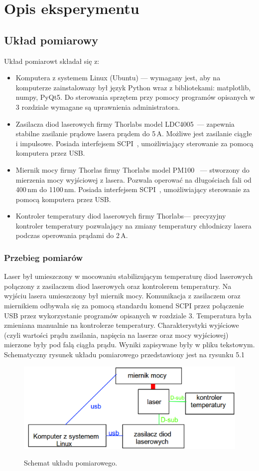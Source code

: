 \chapter{Opis eksperymentu}
\section{Układ pomiarowy}
Układ pomiarowt składał się z:
\begin{itemize}
\item Komputera z systemem Linux (Ubuntu) --- wymagany jest, aby na komputerze zainstalowany był język Python wraz z bibliotekami:
matplotlib, numpy, PyQt5. Do sterowania sprzętem przy pomocy programów opisanych w 3 rozdziale wymagane są uprawnienia administratora.
\item Zasilacza diod laserowych firmy Thorlabs model LDC4005~\cite{Ldc_book}--- zapewnia stabilne zasilanie prądowe lasera prądem do 5\,A.
Możliwe jest zasilanie ciągłe i impulsowe. Posiada interfejsem SCPI~\cite{Ldc_book_prog}, umożliwiający sterowanie za pomocą komputera przez USB.
\item Miernik mocy firmy Thorlas firmy Thorlabs model PM100~\cite{Pm100_book} --- stworzony do mierzenia mocy wyjściowej z lasera. Pozwala operować na
długościach fali od 400\,nm do 1100\,nm. Posiada interfejsem SCPI~\cite{Pm100_book}, umożliwiający sterowanie za pomocą komputera przez USB.
\item Kontroler temperatury diod laserowych firmy Thorlabs--- precyzyjny kontroler temperatury pozwalający na zmiany temperatury
chłodniczy lasera podczas operowania prądami do 2\,A.
\end{itemize}
\subsection{Przebieg pomiarów}
Laser był umieszczony w mocowaniu stabilizującym temperaturę diod laserowych połączony z zasilaczem diod laserowych oraz kontrolerem temperatury.
Na wyjściu lasera umieszczony był miernik mocy. Komunikacja z zasilaczem oraz miernikiem odbywała się za pomocą standardu
komend SCPI przez połączenie USB przez wykorzystanie programów opisanych w rozdziale 3.
Temperatura była zmieniana manualnie na kontrolerze temperatury.
Charakterystyki wyjściowe (czyli wartości prądu zasilania, napięcia na laserze oraz mocy wyjściowej)
mierzone były pod falą ciągła prądu. Wyniki zapisywane były w pliku tekstowym. Schematyczny rysunek układu pomiarowego przedstawiony jest
na rysunku 5.1
\begin{figure}
\center
\includegraphics[scale=0.35]{schemat.eps}
\label{fig:sch_pom}
\caption{Schemat układu pomiarowego.}
\end{figure}